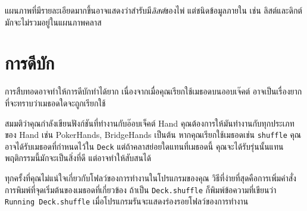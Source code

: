 
แผนภาพที่มีรายละเอียดมากขึ้นอาจแสดงว่าสำรับมี{\em ลิสต์}ของไพ่ แต่ชนิดข้อมูลภายใน เช่น ลิสต์และดิกต์ มักจะไม่รวมอยู่ในแผนภาพคลาส

\section{การดีบัก}

การสืบทอดอาจทำให้การดีบักทำได้ยาก เนื่องจากเมื่อคุณเรียกใช้เมธอดบนออบเจ๊คต์ อาจเป็นเรื่องยากที่จะทราบว่าเมธอดใดจะถูกเรียกใช้ 


สมมติว่าคุณกำลังเขียนฟังก์ชันที่ทำงานกับอ๊อบเจ็คต์ Hand คุณต้องการให้มันทำงานกับทุกประเภทของ Hand 
เช่น PokerHands, BridgeHands เป็นต้น หากคุณเรียกใช้เมธอดเช่น {\tt shuffle} 
คุณอาจได้รับเมธอดที่กำหนดไว้ใน {\tt Deck} แต่ถ้าคลาสย่อยใดแทนที่เมธอดนี้ คุณจะได้รับรุ่นนั้นแทน พฤติกรรมนี้มักจะเป็นสิ่งที่ดี แต่อาจทำให้สับสนได้



ทุกครั้งที่คุณไม่แน่ใจเกี่ยวกับโฟลว์ของการทำงานในโปรแกรมของคุณ วิธีที่ง่ายที่สุดคือการเพิ่มคำสั่งการพิมพ์ที่จุดเริ่มต้นของเมธอดที่เกี่ยวข้อง 
ถ้าเป็น {\tt Deck.shuffle} ก็พิมพ์ข้อความที่เขียนว่า {\tt Running Deck.shuffle} เมื่อโปรแกรมรันจะแสดงร่องรอยโฟลว์ของการทำงาน


